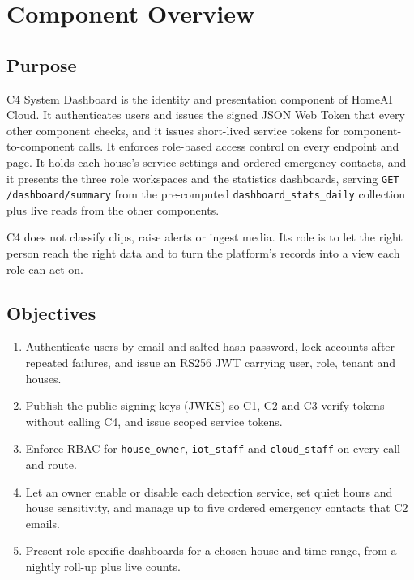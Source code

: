 \section{Component Overview}

\subsection{Purpose}
C4 System Dashboard is the identity and presentation component of HomeAI Cloud. It authenticates users and
issues the signed JSON Web Token that every other component checks, and it issues short-lived service tokens for
component-to-component calls. It enforces role-based access control on every endpoint and page. It holds each
house's service settings and ordered emergency contacts, and it presents the three role workspaces and the
statistics dashboards, serving \texttt{GET /dashboard/summary} from the pre-computed \texttt{dashboard\_stats\_daily}
collection plus live reads from the other components.

C4 does not classify clips, raise alerts or ingest media. Its role is to let the right person reach the right data
and to turn the platform's records into a view each role can act on.

\subsection{Objectives}
\begin{enumerate}
\item Authenticate users by email and salted-hash password, lock accounts after repeated failures, and issue an RS256 JWT carrying user, role, tenant and houses.
\item Publish the public signing keys (JWKS) so C1, C2 and C3 verify tokens without calling C4, and issue scoped service tokens.
\item Enforce RBAC for \texttt{house\_owner}, \texttt{iot\_staff} and \texttt{cloud\_staff} on every call and route.
\item Let an owner enable or disable each detection service, set quiet hours and house sensitivity, and manage up to five ordered emergency contacts that C2 emails.
\item Present role-specific dashboards for a chosen house and time range, from a nightly roll-up plus live counts.
\end{enumerate}

